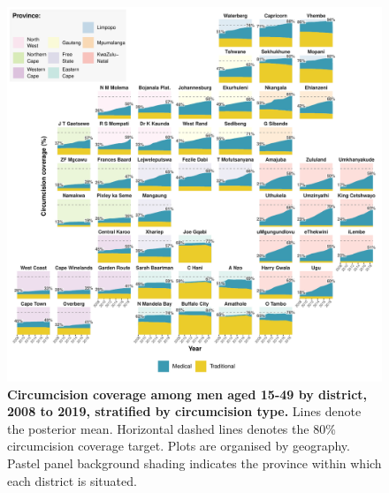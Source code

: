 \documentclass{article}
\begin{document}
\begin{figure}[H]
  \centering
  \includegraphics[width = \linewidth]{Figures/paper/Figure6.pdf}
  \caption{{\bf Circumcision coverage among men aged 15-49 by district, 2008 to 2019, stratified by circumcision type.} Lines denote the posterior mean. Horizontal dashed lines denotes the 80\% circumcision coverage target. Plots are organised by geography. Pastel panel background shading indicates the province within which each district is situated.}
  \label{fig::district1549prev}
\end{figure}

\end{document}

